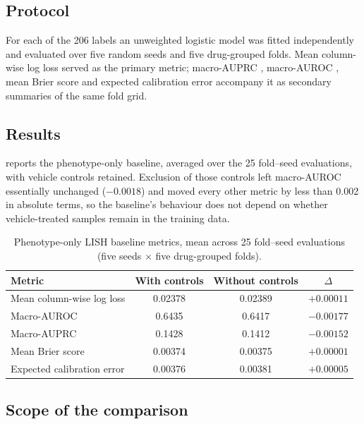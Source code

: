 \documentclass[11pt,a4paper]{article}
\begin{document}
\subsection{Protocol}

For each of the \num{206} labels an unweighted logistic model was fitted independently and evaluated over five random seeds and five drug-grouped folds. Mean column-wise log loss served as the primary metric; macro-AUPRC \citep{davis2006auprc}, macro-AUROC \citep{bmj2006rocauc}, mean Brier score and expected calibration error \citep{natoesci2017ece} accompany it as secondary summaries of the same fold grid.

\subsection{Results}
\label{sec:lish_si_results}

 reports the phenotype-only baseline, averaged over the \num{25} fold--seed evaluations, with vehicle controls retained. Exclusion of those controls left macro-AUROC essentially unchanged ($-\num{0.0018}$) and moved every other metric by less than \num{0.002} in absolute terms, so the baseline's behaviour does not depend on whether vehicle-treated samples remain in the training data.

\begin{table}[h]
\centering
\caption{Phenotype-only LISH baseline metrics, mean across \num{25} fold--seed evaluations (five seeds $\times$ five drug-grouped folds).}
\label{tab:lish_metrics}
\begin{tabular}{lccc}
\toprule
Metric & With controls & Without controls & $\Delta$ \\
\midrule
Mean column-wise log loss & \num{0.02378} & \num{0.02389} & $+\num{0.00011}$ \\
Macro-AUROC & \num{0.6435} & \num{0.6417} & $-\num{0.00177}$ \\
Macro-AUPRC & \num{0.1428} & \num{0.1412} & $-\num{0.00152}$ \\
Mean Brier score & \num{0.00374} & \num{0.00375} & $+\num{0.00001}$ \\
Expected calibration error & \num{0.00376} & \num{0.00381} & $+\num{0.00005}$ \\
\bottomrule
\end{tabular}
\end{table}

\subsection{Scope of the comparison}
\end{document}
